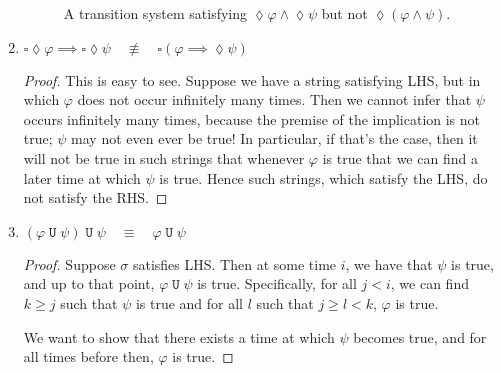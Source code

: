 \documentclass[letterpaper,11pt]{article}
\newcommand{\eventually}{\lozenge}
\newcommand{\always}{\square}
\DeclareMathOperator{\untilOp}{\mathtt{U}}
\newcommand{\until}{\untilOp{}}
\newcommand{\parens}[1]{\left(#1\right)}
\newcommand{\quadequiv}{\quad \equiv \quad}
\newcommand{\nquadequiv}{\quad \not \equiv \quad}
\begin{document}
\begin{enumerate}
\begin{figure}[ht]
            \caption{
                A transition system satisfying
                $\eventually \varphi \land \eventually \psi$
                but not
                $\eventually \parens{\varphi \land \psi}$.
            }
            \label{fig:ts-counterexample-1}
        \end{figure}

        \setcounter{enumi}{6} %
    \item
        $
        \always \eventually \varphi \implies \always \eventually \psi
        \nquadequiv
        \always \parens{
            \varphi \implies \eventually \psi
        }
        $

        \begin{proof}
            This is easy to see. Suppose we have a string satisfying LHS, but
            in which $\varphi$ does not occur infinitely many times. Then we
            cannot infer that $\psi$ occurs infinitely many times, because the
            premise of the implication is not true; $\psi$ may not even ever be
            true! In particular, if that's the case, then it will not be true
            in such strings that whenever $\varphi$ is true that we can find a
            later time at which $\psi$ is true. Hence such strings, which
            satisfy the LHS, do not satisfy the RHS.
        \end{proof}

    \item
        $
        \parens{\varphi \until \psi} \until \psi
        \quadequiv
        \varphi \until \psi
        $

        \begin{proof}
            Suppose $\sigma$ satisfies LHS.
            Then at some time $i$, we have that $\psi$ is true, and up to that
            point, $\varphi \until \psi$ is true. Specifically, for all
            $j < i$, we can find $k \geq j$ such that $\psi$ is true and for
            all $l$ such that $j \geq l < k$, $\varphi$ is true.

            We want to show that there exists a time at which $\psi$ becomes
            true, and for all times before then, $\varphi$ is true.


\end{proof}
\end{enumerate}
\end{document}
